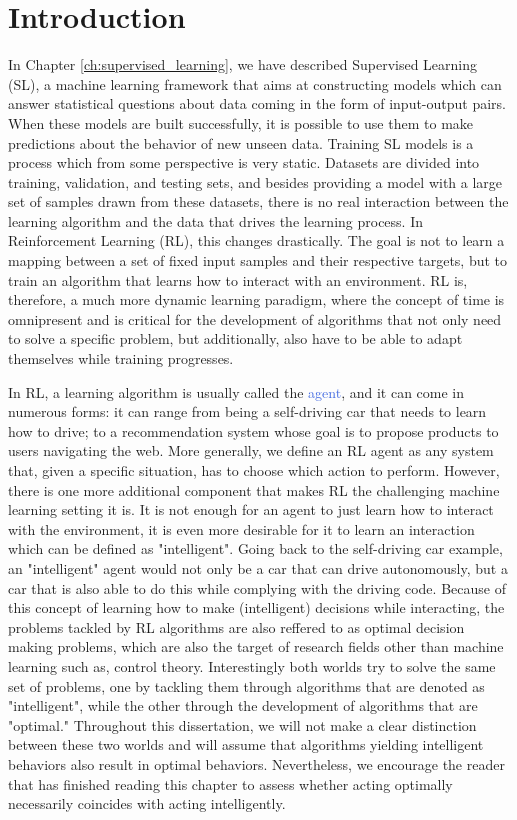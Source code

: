 \section{Introduction}
\label{sec:rl_introduction}
In Chapter \ref{ch:supervised_learning}, we have described Supervised Learning (SL), a machine learning framework that aims at constructing models which can answer statistical questions about data coming in the form of input-output pairs. When these models are built successfully, it is possible to use them to make predictions about the behavior of new unseen data. Training SL models is a process which from some perspective is very static. Datasets are divided into training, validation, and testing sets, and besides providing a model with a large set of samples drawn from these datasets, there is no real interaction between the learning algorithm and the data that drives the learning process. In Reinforcement Learning (RL), this changes drastically. The goal is not to learn a mapping between a set of fixed input samples and their respective targets, but to train an algorithm that learns how to interact with an environment. RL is, therefore, a much more dynamic learning paradigm, where the concept of time is omnipresent and is critical for the development of algorithms that not only need to solve a specific problem, but additionally, also have to be able to adapt themselves while training progresses.

In RL, a learning algorithm is usually called the \textcolor{RoyalBlue}{agent}, and it can come in numerous forms: it can range from being a self-driving car that needs to learn how to drive; to a recommendation system whose goal is to propose products to users navigating the web. More generally, we define an RL agent as any system that, given a specific situation, has to choose which action to perform. However, there is one more additional component that makes RL the challenging machine learning setting it is.
It is not enough for an agent to just learn how to interact with the environment, it is even more desirable for it to learn an interaction which can be defined as "intelligent". Going back to the self-driving car example, an "intelligent" agent would not only be a car that can drive autonomously, but a car that is also able to do this while complying with the driving code. Because of this concept of learning how to make (intelligent) decisions while interacting, the problems tackled by RL algorithms are also reffered to as optimal decision making problems, which are also the target of research fields other than machine learning such as, control theory. Interestingly both worlds try to solve the same set of problems, one by tackling them through algorithms that are denoted as "intelligent", while the other through the development of algorithms that are "optimal." Throughout this dissertation, we will not make a clear distinction between these two worlds and will assume that algorithms yielding intelligent behaviors also result in optimal behaviors. Nevertheless, we encourage the reader that has finished reading this chapter to assess whether acting optimally necessarily coincides with acting intelligently.


